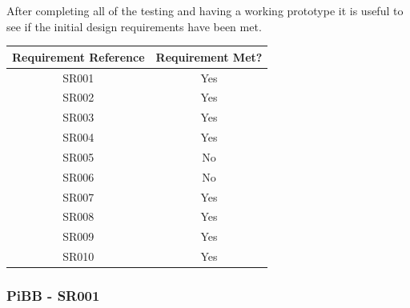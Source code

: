 \documentclass[10pt,a4paper]{article}
\begin{document}
After completing all of the testing and having a working prototype it is useful to see if the initial design requirements have been met.
\begin{table}[]
  \begin{tabular}{@{}cc@{}}
  \toprule
  \multicolumn{1}{l}{\textbf{Requirement Reference}} & \multicolumn{1}{l}{\textbf{Requirement Met?}} \\ \midrule
  SR001                                              & Yes                                           \\
  SR002                                              & Yes                                           \\
  SR003                                              & Yes                                           \\
  SR004                                              & Yes                                           \\
  SR005                                              & No                                            \\
  SR006                                              & No                                            \\
  SR007                                              & Yes                                           \\
  SR008                                              & Yes                                           \\
  SR009                                              & Yes                                           \\
  SR010                                              & Yes                                           \\ \bottomrule
  \end{tabular}
\end{table}

\subsubsection{PiBB - SR001}
\begin{center}
  \par
\end{center}
\end{document}
